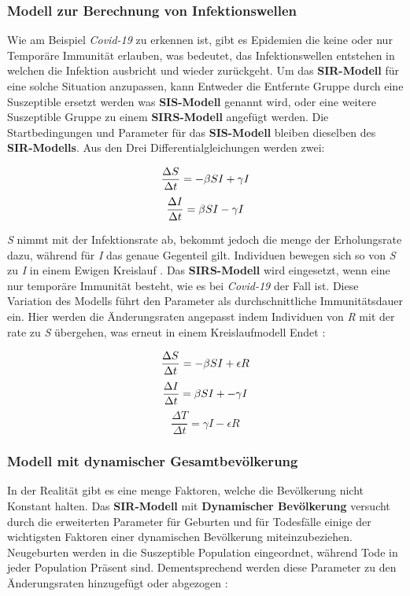 \documentclass[12pt]{scrartcl} %
\begin{document}
\subsubsection{Modell zur Berechnung von Infektionswellen}

Wie am Beispiel \textsl{Covid-19} zu erkennen ist, gibt es Epidemien die keine oder nur Temporäre Immunität erlauben, was bedeutet, das Infektionswellen entstehen in welchen die Infektion ausbricht und wieder zurückgeht. Um das \textbf{SIR-Modell} für eine solche Situation anzupassen, kann Entweder die Entfernte Gruppe durch eine Suszeptible ersetzt werden was \textbf{SIS-Modell} genannt wird, oder eine weitere Suszeptible Gruppe zu einem \textbf{SIRS-Modell} angefügt werden. Die Startbedingungen und Parameter für das \textbf{SIS-Modell} bleiben dieselben des \textbf{SIR-Modells}. Aus den Drei Differentialgleichungen werden zwei:

$$ \frac{\Delta S}{\Delta t} = -\beta\space S I + \gamma I $$
$$ \frac{\Delta I}{\Delta t} = \beta\space S I - \gamma I$$

\textit{S} nimmt mit der Infektionsrate \textbeta\space ab, bekommt jedoch die menge der Erholungsrate \textgamma\space dazu, während für \textit{I} das genaue Gegenteil gilt. Individuen bewegen sich so von \textit{S} zu \textit{I} in einem Ewigen Kreislauf
 \cite{5}. Das \textbf{SIRS-Modell} wird eingesetzt, wenn eine nur temporäre Immunität besteht, wie es bei \textsl{Covid-19} der Fall ist. Diese Variation des Modells führt den Parameter \textepsilon\space als durchschnittliche Immunitätsdauer ein. Hier werden die Änderungsraten angepasst indem Individuen von \textit{R} mit der rate \textepsilon\space zu \textit{S} übergehen, was erneut in einem Kreislaufmodell Endet \cite{8}:

$$ \frac{\Delta S}{\Delta t} = -\beta\space S I + \epsilon R $$
$$ \frac{\Delta I}{\Delta t} = \beta\space S I + -\gamma I $$
$$ \frac{\Delta T}{\Delta t} = \gamma I - \epsilon R $$


\subsubsection{Modell mit dynamischer Gesamtbevölkerung}

In der Realität gibt es eine menge Faktoren, welche die Bevölkerung nicht Konstant halten. Das \textbf{SIR-Modell} mit \textbf{Dynamischer Bevölkerung} versucht durch die erweiterten Parameter \textnu\space für Geburten und \textmu\space für Todesfälle einige der wichtigsten Faktoren einer dynamischen Bevölkerung miteinzubeziehen. Neugeburten werden in die Suszeptible Population eingeordnet, während Tode in jeder Population Präsent sind. Dementsprechend werden diese Parameter zu den Änderungsraten hinzugefügt oder abgezogen \cite{8}:
\end{document}
